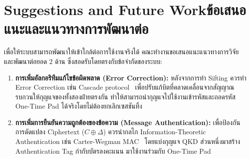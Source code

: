 \section{\ifenglish Suggestions and Future Work\else ข้อเสนอแนะและแนวทางการพัฒนาต่อ\fi}

เพื่อให้ระบบสามารถพัฒนาให้เข้าใกล้ต่อการใช้งานจริงได้ คณะทำงานขอเสนอแนะแนวทางการวิจัยและพัฒนาต่อยอด 2 ด้าน ซึ่งสอดรับโดยตรงกับข้อจำกัดของระบบ:

\begin{enumerate}
    \item \textbf{การเพิ่มอัลกอริทึมแก้ไขข้อผิดพลาด (Error Correction):} หลังจากการทำ Sifting ควรทำ Error Correction เช่น Cascade protocol~\cite{brassard_salvail_cascade} เพื่อปรับแก้บิตที่คลาดเคลื่อนจากสัญญาณรบกวนให้กุญแจของทั้งสองฝ่ายตรงกัน ทำให้สามารถนำกุญแจไปใช้งานเข้ารหัสและถอดรหัส One-Time Pad ได้จริงโดยไม่ต้องยกเลิกเซสชันทิ้ง
    
    \item \textbf{การเพิ่มการยืนยันความถูกต้องของข้อความ (Message Authentication):} เพื่อป้องกันการดัดแปลง Ciphertext ($C \oplus \Delta$) ควรนำกลไก Information-Theoretic Authentication เช่น Carter-Wegman MAC~\cite{wegman_carter_1981, carter_wegman_universal} โดยแบ่งกุญแจ QKD ส่วนหนึ่งมาสร้าง Authentication Tag กำกับบัตรลงคะแนน มาใช้งานร่วมกับ One-Time Pad
\end{enumerate}
